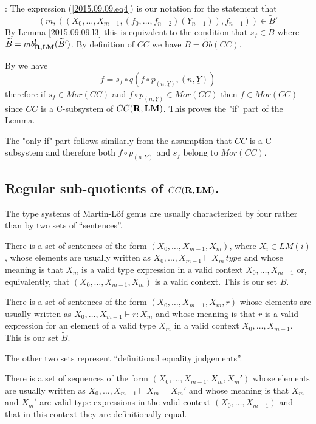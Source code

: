 \documentclass[11pt]{article}
\newenvironment{proof}{{\bf Proof}:}{\vskip 5mm }
\newcommand{\rr}{{\bf R}}
\newcommand{\lm}{{\bf LM}}
\newcommand{\uu}{\underline}
\newcommand{\wt}{\widetilde}
\begin{document}
%
\begin{proof}
The expression (\ref{2015.09.09.eq4}) is our notation for the statement that 
%
$$(m,((X_0,\dots,X_{m-1},(f_0,\dots,f_{n-2})(Y_{n-1})),f_{n-1}))\in \wt{B}'$$
%
By Lemma \ref{2015.09.09.l3} this is equivalent to the condition that $s_f\in \wt{B}$ where $\wt{B}=mb^!_{\rr,\lm}(\wt{B}')$. By definition of $CC$ we have $\wt{B}=\wt{Ob}(CC)$. 

By \cite[Definition 2.3(3)]{Csubsystems} we have 
%
$$f=s_f\circ q(f\circ p_{(n,\uu{Y})},(n,\uu{Y}))$$
%
therefore if $s_f\in Mor(CC)$ and $f\circ p_{(n,\uu{Y})}\in Mor(CC)$ then $f\in Mor(CC)$ since $CC$ is a C-subsystem of $CC(\rr,\lm)$. This proves the "if" part of the Lemma. 

The "only if" part follows similarly from the assumption that $CC$ is a C-subsystem and therefore both $f\circ p_{(n,\uu{Y})}$ and $s_f$ belong to $Mor(CC)$.
\end{proof}
%







\subsection{Regular sub-quotients of $CC(\rr,\lm)$.} 
%
The type systems of Martin-L\"of genus are usually characterized by four rather than by two sets of ``sentences''. 

There is a set of sentences of the form $(X_0,\dots,X_{m-1},X_m)$, where $X_i\in LM(i)$, whose elements are usually written as $X_0,\dots,X_{m-1}\vdash X_m\,type$ and whose meaning is that 
$X_m$ is a valid type expression in a valid context $X_0,\dots,X_{m-1}$ or, equivalently, that $(X_0,\dots,X_{m-1},X_m)$ is a valid context. This is our set $B$. 

There is a set of sentences of the form $(X_0,\dots,X_{m-1},X_m,r)$ whose elements are usually written as $X_0,\dots,X_{m-1}\vdash r:X_m$ and whose meaning is that 
$r$ is a valid expression for an element of a valid type $X_m$ in a valid context $X_0,\dots,X_{m-1}$.  This is our set $\wt{B}$.

The other two sets represent ``definitional equality judgements''. 

There is a set of sequences of the form $(X_0,\dots,X_{m-1},X_m,X_m')$ whose elements are usually written as $X_0,\dots,X_{m-1}\vdash X_m=X_m'$ and whose meaning is that $X_m$ and $X_m'$ are valid type expressions in the valid context $(X_0,\dots,X_{m-1})$ and that in this context they are definitionally equal. 
\end{document}

